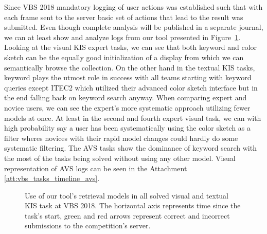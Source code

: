 Since VBS 2018 mandatory logging of user actions was established such that with each frame sent to the server basic set of actions that lead to the result was submitted. Even though complete analysis will be published in a separate journal, we can at least show and analyze logs from our tool presented in Figure~\ref{fig:vbs_tasks_timeline}. Looking at the visual KIS expert tasks, we can see that both keyword and color sketch can be the equally good initialization of a display from which we can semantically browse the collection. On the other hand in the textual KIS tasks, keyword plays the utmost role in success with all teams starting with keyword queries except ITEC2 which utilized their advanced color sketch interface but in the end falling back on keyword search anyway. When comparing expert and novice users, we can see the expert's more systematic approach utilizing fewer models at once. At least in the second and fourth expert visual task, we can with high probability say a user has been systematically using the color sketch as a filter wheres novices with their rapid model changes could hardly do some systematic filtering. The AVS tasks show the dominance of keyword search with the most of the tasks being solved without using any other model. Visual representation of AVS logs can be seen in the Attachment \ref{att:vbs_tasks_timeline_avs}.

\begin{figure}
	\centering
	
	
	\caption[Use of tool's retrieval models in KIS tasks]{Use of our tool's retrieval models in all solved visual and textual KIS task at VBS 2018. The horizontal axis represents time since the task's start, green and red arrows represent correct and incorrect submissions to the competition's server.}
	\label{fig:vbs_tasks_timeline}
\end{figure}
